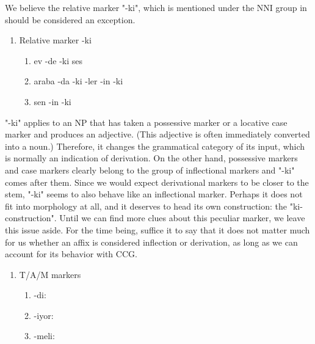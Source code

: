 \documentclass[11pt]{article} %
\begin{document}
We believe the relative marker "-ki", which is mentioned under the NNI group in \citet{Bozsahin2018} should be considered an exception.

\begin{enumerate}[resume*]
	\item Relative marker -ki
	\begin{enumerate}[label=(\alph*), ref=(\alph*)]\itemsep1pt
	\item ev -de -ki ses
	\item araba -da -ki -ler -in -ki
	\item sen -in -ki
	\end{enumerate}
\end{enumerate}

"-ki" applies to an NP that has taken a possessive marker or a locative case marker and produces an adjective. (This adjective is often immediately converted into a noun.) Therefore, it changes the grammatical category of its input, which is normally an indication of derivation. On the other hand, possessive markers and case markers clearly belong to the group of inflectional markers and  "-ki" comes after them. Since we would expect derivational markers to be closer to the stem, "-ki" seems to also behave like an inflectional marker. Perhaps it does not fit into morphology at all, and it deserves to head its own construction: the "ki-construction". Until we can find more clues about this peculiar marker, we leave this issue aside. For the time being, suffice it to say that it does not matter much for us whether an affix is considered inflection or derivation, as long as we can account for its behavior with CCG. \\

\begin{enumerate}[resume*]
	\item T/A/M markers \label{TAM}
	\begin{enumerate}[label=(\alph*), ref=(\alph*)]\itemsep1pt
	\item -di:  \label{a}
	\item -iyor:  \label{b}
	\item -meli:  \label{c}
	\end{enumerate}
\end{enumerate}
\end{document}
